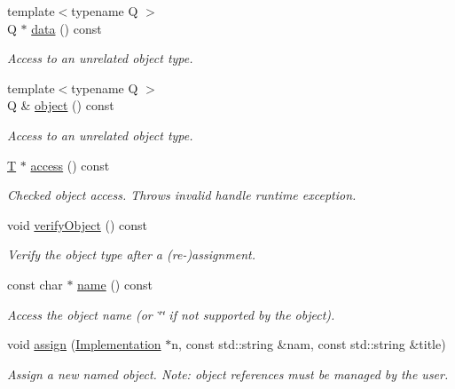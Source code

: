 \begin{DoxyCompactItemize}
{\footnotesize template$<$typename Q $>$ }\\Q $\ast$ \hyperlink{class_d_d4hep_1_1_handle_a821fe41f46aa5ce97cfb04a6a60e5cd5}{data} () const 
\begin{DoxyCompactList}\small\item\em Access to an unrelated object type. \item\end{DoxyCompactList}\item 
{\footnotesize template$<$typename Q $>$ }\\Q \& \hyperlink{class_d_d4hep_1_1_handle_a4e03007979a62db6fa11af123f2b318c}{object} () const 
\begin{DoxyCompactList}\small\item\em Access to an unrelated object type. \item\end{DoxyCompactList}\item 
\hyperlink{class_t}{T} $\ast$ \hyperlink{class_d_d4hep_1_1_handle_a1a5500d3bf236420d8ba63979aff8599}{access} () const 
\begin{DoxyCompactList}\small\item\em Checked object access. Throws invalid handle runtime exception. \item\end{DoxyCompactList}\item 
void \hyperlink{class_d_d4hep_1_1_handle_a664da2f5ac76434379046989853da656}{verifyObject} () const 
\begin{DoxyCompactList}\small\item\em Verify the object type after a (re-\/)assignment. \item\end{DoxyCompactList}\item 
const char $\ast$ \hyperlink{class_d_d4hep_1_1_handle_a9c62b8d37e0f2354bae0093498dc15a1}{name} () const 
\begin{DoxyCompactList}\small\item\em Access the object name (or \char`\"{}\char`\"{} if not supported by the object). \item\end{DoxyCompactList}\item 
void \hyperlink{class_d_d4hep_1_1_handle_a9f5b5d3feb89adf95fdfc4148c711209}{assign} (\hyperlink{class_t}{Implementation} $\ast$n, const std::string \&nam, const std::string \&title)
\begin{DoxyCompactList}\small\item\em Assign a new named object. Note: object references must be managed by the user. \item\end{DoxyCompactList}\item 

\end{DoxyCompactItemize}

